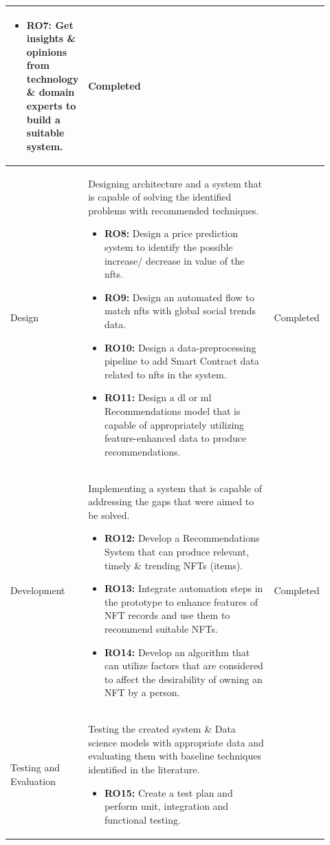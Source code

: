 \begin{longtable}{| p{0.135\linewidth} | p{0.63\linewidth}| p{0.15\linewidth}|}
\begin{itemize}
\item \textbf{RO7:} Get insights \&  opinions from technology \& domain experts to build a suitable system.
\vspace{-7mm}       %
\end{itemize}
&
Completed\\
\hline
Design & Designing architecture and a system that is capable of solving the identified problems with recommended techniques.
\begin{itemize}
\item \textbf{RO8:} Design a price prediction system to identify the possible increase/ decrease in value of the \Gls{nft}s.
\item \textbf{RO9:} Design an automated flow to match \Gls{nft}s with global social trends data.
\item \textbf{RO10:} Design a data-preprocessing pipeline to add Smart Contract data related to \Gls{nft}s in the system.
\item \textbf{RO11:} Design a \Gls{dl} or \Gls{ml} Recommendations model that is capable of appropriately utilizing feature-enhanced data to produce recommendations.
\vspace{-7mm}       %
\end{itemize}
&
Completed\\
\hline
Development & Implementing a system that is capable of addressing the gaps that were aimed to be solved. 
\begin{itemize}
\item \textbf{RO12:} Develop a Recommendations System that can produce relevant, timely \& trending NFTs (items).
\item \textbf{RO13:} Integrate automation steps in the prototype to enhance features of NFT records and use them to recommend suitable NFTs.
\item \textbf{RO14:} Develop an algorithm that can utilize factors that are considered to affect the desirability of owning an NFT by a person.
\vspace{-7mm}       %
\end{itemize}
&
Completed\\
\hline
Testing and Evaluation & Testing the created system \& Data science models with appropriate data and evaluating them with baseline techniques identified in the literature. 
\begin{itemize}
\item \textbf{RO15:} Create a test plan and perform unit, integration and functional testing.

\end{itemize}
\end{longtable}
